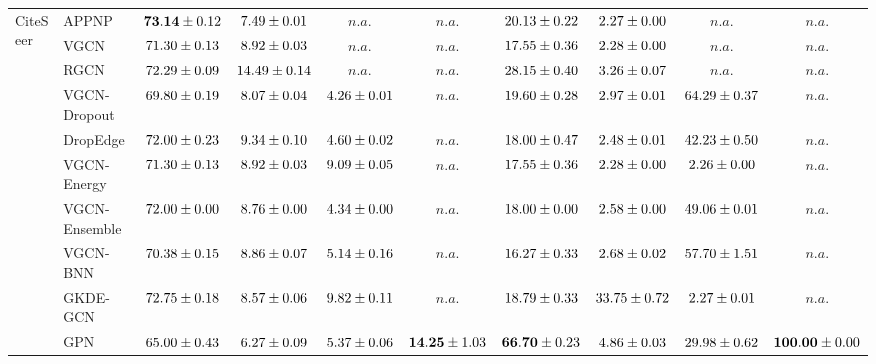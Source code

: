 \begin{table*}[!h]
{\begin{tabular}{ll|cccc|cccc}
        \multirow{10}{*}{CiteSeer}
        & APPNP & ${\mathbf{73.14}\tiny \pm 0.12}$ & ${7.49\tiny \pm 0.01}$ & $n.a.$ & $n.a.$ & ${20.13\tiny \pm 0.22}$ & ${2.27\tiny \pm 0.00}$ & $n.a.$ & $n.a.$\\
        & VGCN & ${71.30\tiny \pm 0.13}$ & ${8.92\tiny \pm 0.03}$ & $n.a.$ & $n.a.$ & ${17.55\tiny \pm 0.36}$ & ${2.28\tiny \pm 0.00}$ & $n.a.$ & $n.a.$\\
        & RGCN & ${72.29\tiny \pm 0.09}$ & ${{14.49}\tiny \pm 0.14}$ & $n.a.$ & $n.a.$ & ${28.15\tiny \pm 0.40}$ & ${3.26\tiny \pm 0.07}$ & $n.a.$ & $n.a.$\\
        & VGCN-Dropout & ${69.80\tiny \pm 0.19}$ & ${8.07\tiny \pm 0.04}$ & ${4.26\tiny \pm 0.01}$ & $n.a.$ & ${19.60\tiny \pm 0.28}$ & ${2.97\tiny \pm 0.01}$ & ${{64.29}\tiny \pm 0.37}$ & $n.a.$\\
        & DropEdge & ${72.00\tiny \pm 0.23}$ & ${9.34\tiny \pm 0.10}$ & ${4.60\tiny \pm 0.02}$ & $n.a.$ & ${18.00\tiny \pm 0.47}$ & ${2.48\tiny \pm 0.01}$ & ${42.23\tiny \pm 0.50}$ & $n.a.$\\
        & VGCN-Energy & ${71.30\tiny \pm 0.13}$ & ${8.92\tiny \pm 0.03}$ & ${9.09\tiny \pm 0.05}$ & $n.a.$ & ${17.55\tiny \pm 0.36}$ & ${2.28\tiny \pm 0.00}$ & ${2.26\tiny \pm 0.00}$ & $n.a.$\\
        & VGCN-Ensemble & ${72.00\tiny \pm 0.00}$ & ${8.76\tiny \pm 0.00}$ & ${4.34\tiny \pm 0.00}$ & $n.a.$ & ${18.00\tiny \pm 0.00}$ & ${2.58\tiny \pm 0.00}$ & ${49.06\tiny \pm 0.01}$ & $n.a.$\\
        & VGCN-BNN & ${70.38\tiny \pm 0.15}$ & ${8.86\tiny \pm 0.07}$ & ${5.14\tiny \pm 0.16}$ & $n.a.$ & ${16.27\tiny \pm 0.33}$ & ${2.68\tiny \pm 0.02}$ & ${57.70\tiny \pm 1.51}$ & $n.a.$\\
        & GKDE-GCN & ${72.75\tiny \pm 0.18}$ & ${8.57\tiny \pm 0.06}$ & ${{9.82}\tiny \pm 0.11}$ & $n.a.$ & ${18.79\tiny \pm 0.33}$ & ${{33.75}\tiny \pm 0.72}$ & ${2.27\tiny \pm 0.01}$ & $n.a.$\\
        & GPN & ${65.00\tiny \pm 0.43}$ & ${6.27\tiny \pm 0.09}$ & ${5.37\tiny \pm 0.06}$ & ${\mathbf{14.25}\tiny \pm 1.03}$ & ${\mathbf{66.70}\tiny \pm 0.23}$ & ${4.86\tiny \pm 0.03}$ & ${29.98\tiny \pm 0.62}$ & ${\mathbf{100.00}\tiny \pm 0.00}$\\


\end{tabular}}
\end{table*}
